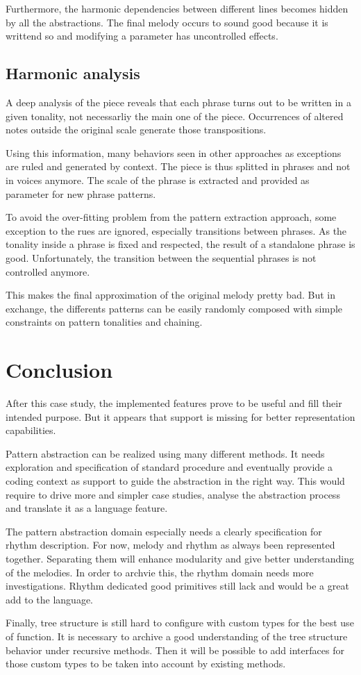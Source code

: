 \documentclass[twocolumn, 11pt]{article}
\begin{document}
Furthermore, the harmonic dependencies between different lines becomes hidden by all the abstractions. The final melody occurs to sound good because it is writtend so and modifying a parameter has uncontrolled effects.

\subsection{Harmonic analysis}

A deep analysis of the piece reveals that each phrase turns out to be written in a given tonality, not necessarliy the main one of the piece.
Occurrences of altered notes outside the original scale generate those transpositions.

Using this information, many behaviors seen in other approaches as exceptions are ruled and generated by context.
The piece is thus splitted in phrases and not in voices anymore. The scale of the phrase is extracted and provided as parameter for new phrase patterns.

To avoid the over-fitting problem from the pattern extraction approach, some exception to the rues are ignored, especially transitions between phrases. As the tonality inside a phrase is fixed and respected, the result of a standalone phrase is good. Unfortunately, the transition between the sequential phrases is not controlled anymore.


This makes the final approximation of the original melody pretty bad. But in exchange, the differents patterns can be easily randomly composed with simple constraints on pattern tonalities and chaining.


\section{Conclusion}

After this case study, the implemented features prove to be useful and fill their intended purpose.
But it appears that support is missing for better representation capabilities.

Pattern abstraction can be realized using many different methods. It needs exploration and specification of standard procedure and eventually provide a coding context as support to guide the abstraction in the right way.
This would require to drive more and simpler case studies, analyse the abstraction process and translate it as a language feature.

The pattern abstraction domain especially needs a clearly specification for rhythm description. For now, melody and rhythm as always been represented together. Separating them will enhance modularity and give better understanding of the melodies.
In order to archvie this, the rhythm domain needs more investigations. Rhythm dedicated good primitives still lack and would be a great add to the language.

Finally, tree structure is still hard to configure with custom types for the best use of  function. It is necessary to archive a good understanding of the tree structure behavior under recursive methods. Then it will be possible to add interfaces for those custom types to be taken into account by existing methods.
\end{document}
